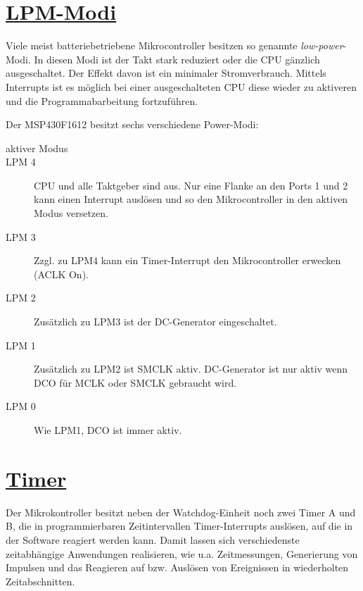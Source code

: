 \documentclass[11pt,german]{scrartcl}
\begin{document}
\clearpage
\section
{\href{http://cst.mi.fu-berlin.de/intern/19606-P-MPP/Aufgaben/040500.html}
{LPM-Modi}}

Viele meist batteriebetriebene Mikrocontroller besitzen so genannte \emph{low-power}-Modi.
In diesen Modi ist der Takt stark reduziert oder die CPU gänzlich ausgeschaltet. Der Effekt davon ist ein minimaler Stromverbrauch.
Mittels Interrupts ist es möglich bei einer ausgeschalteten CPU diese wieder zu aktiveren und die Programmabarbeitung fortzuführen.

Der MSP430F1612 besitzt sechs verschiedene Power-Modi:
\begin{description}
    \item [aktiver Modus]
    \item [LPM 4] CPU und alle Taktgeber sind aus. Nur eine Flanke an den Ports 1 und 2 kann einen Interrupt auslösen und so den Mikrocontroller in den aktiven Modus versetzen.
    \item [LPM 3] Zzgl. zu LPM4 kann ein Timer-Interrupt den Mikrocontroller erwecken (ACLK On).
    \item [LPM 2] Zusätzlich zu LPM3 ist der DC-Generator eingeschaltet.
    \item [LPM 1] Zusätzlich zu LPM2 ist SMCLK aktiv. DC-Generator ist nur aktiv wenn DCO für MCLK oder SMCLK gebraucht wird.
    \item [LPM 0] Wie LPM1, DCO ist immer aktiv.
\end{description}






\clearpage
\section
{\href{http://cst.mi.fu-berlin.de/intern/19606-P-MPP/Aufgaben/040600.html}
{Timer}}

Der Mikrokontroller besitzt neben der Watchdog-Einheit noch zwei Timer A und B, die in programmierbaren Zeitintervallen Timer-Interrupts auslösen, auf die in der Software reagiert werden kann. Damit lassen sich verschiedenste zeitabhängige Anwendungen realisieren, wie u.a. Zeitmessungen, Generierung von Impulsen und das Reagieren auf bzw. Auslösen von Ereignissen in wiederholten Zeitabschnitten.
\end{document}
